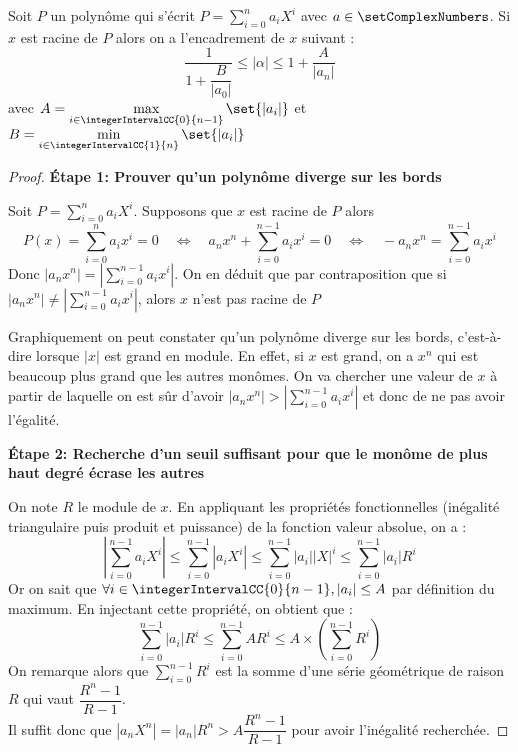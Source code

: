 \begin{theorem}
Soit $P$ un polynôme qui s'écrit $P = \displaystyle\sum\limits_{i = 0}^{n} a_i X^i$ avec $a \in \setComplexNumbers$. Si $x$ est racine de $P$ alors on a l'encadrement de $x$ suivant : 
\[
 \dfrac{1}{1+\dfrac{B}{|a_0|}} \le |\alpha| \le 1 + \dfrac{A}{|a_n|} 
\]
avec $A = \max\limits_{i\in \integerIntervalCC{0}{n-1}}\set{|a_i|}$ et $B = \min\limits_{i\in \integerIntervalCC{1}{n}}\set{|a_i|}$
\end{theorem}

\begin{proof}
\textbf{Étape 1: Prouver qu'un polynôme diverge sur les bords}

Soit $P = \displaystyle\sum\limits_{i = 0}^{n} a_i X^i$.  Supposons que $x$ est racine de $P$ alors
\[
P(x)=\displaystyle\sum\limits_{i = 0}^{n} a_i x^i = 0 \quad\Longleftrightarrow\quad 
a_n x^n+\displaystyle\sum\limits_{i = 0}^{n-1} a_i x^i = 0
\quad\Longleftrightarrow\quad 
- a_n x^n = \displaystyle\sum\limits_{i = 0}^{n-1} a_i x^i
\]
Donc $|a_n x^n| = \left|\displaystyle\sum\limits_{i = 0}^{n-1} a_i x^i \right|$. On en déduit que par contraposition que si $|a_n x^n| \ne \left|\displaystyle\sum\limits_{i = 0}^{n-1} a_i x^i \right|$, alors $x$ n'est pas racine de $P$

Graphiquement on peut constater qu'un polynôme diverge sur les bords, c'est-à-dire lorsque $|x|$ est grand en module. En effet, si $x$ est grand, on a $x^n$ qui est beaucoup plus grand que les autres monômes. On va chercher une valeur de $x$ à partir de laquelle on est sûr d'avoir $|a_n x^n| > \left|\displaystyle\sum\limits_{i = 0}^{n-1} a_i x^i \right|$ et donc de ne pas avoir l'égalité. 
\vspace{1.5\baselineskip}

\textbf{Étape 2: Recherche d'un seuil suffisant pour que le monôme de plus haut degré écrase les autres}

On note $R$ le module de $x$. En appliquant les propriétés fonctionnelles (inégalité triangulaire puis produit et puissance) de la fonction valeur absolue, on a :
\[
\left|\displaystyle\sum\limits_{i = 0}^{n-1} a_i X^i\right|
\le \displaystyle\sum\limits_{i = 0}^{n-1} |a_i X^i|
\le \displaystyle\sum\limits_{i = 0}^{n-1} |a_i| |X|^i
\le \displaystyle\sum\limits_{i = 0}^{n-1} |a_i| R^i
\]
Or on sait que $\forall i \in \integerIntervalCC{0}{n-1}, |a_i| \le A$ par définition du maximum. En injectant cette propriété, on obtient que : 
\[
\displaystyle\sum\limits_{i = 0}^{n-1} |a_i| R^i \le \displaystyle\sum\limits_{i = 0}^{n-1} A R^i \le A \times \left( \displaystyle\sum\limits_{i = 0}^{n-1} R^i \right)
\]
On remarque alors que $\displaystyle\sum\limits_{i = 0}^{n-1} R^i$ est la somme d'une série géométrique de raison $R$ qui vaut $\dfrac{R^{n}-1}{R-1}$. \\
Il suffit donc que $|a_n X^n| = |a_n| R^n > A \dfrac{R^{n}-1}{R-1}$ pour avoir l'inégalité recherchée. 


\end{proof}
